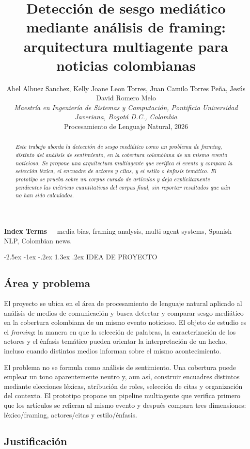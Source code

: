 \documentclass[10pt,twocolumn]{article}
\title{\textbf{Detección de sesgo mediático mediante análisis de framing:\\
arquitectura multiagente para noticias colombianas}}
\author{Abel Albuez Sanchez, Kelly Joane Leon Torres, Juan Camilo Torres Peña, Jesús David Romero Melo\\
\small\textit{Maestría en Ingeniería de Sistemas y Computación, Pontificia Universidad Javeriana, Bogotá D.C., Colombia}\\
\small Procesamiento de Lenguaje Natural, 2026}
\date{}
\makeatletter
\renewcommand{\section}{\@startsection{section}{1}{\z@}%
  {-2.5ex \@plus -1ex \@minus -.2ex}%
  {1.3ex \@plus .2ex}%
  {\normalfont\large\bfseries\centering}}
\makeatother
\begin{document}
\maketitle
\begin{abstract}
\textit{Este trabajo aborda la detección de sesgo mediático como un problema
de framing, distinto del análisis de sentimiento, en la cobertura colombiana
de un mismo evento noticioso. Se propone una arquitectura multiagente que
verifica el evento y compara la selección léxica, el encuadre de actores y
citas, y el estilo o énfasis temático. El prototipo se prueba sobre un corpus
curado de artículos y deja explícitamente pendientes las métricas cuantitativas
del corpus final, sin reportar resultados que aún no han sido calculados.}
\end{abstract}

\noindent\textbf{Index Terms---} media bias, framing analysis, multi-agent systems,
Spanish NLP, Colombian news.

\section{IDEA DE PROYECTO}

\subsection{Área y problema}

El proyecto se ubica en el área de procesamiento de lenguaje natural aplicado
al análisis de medios de comunicación y busca detectar y comparar sesgo
mediático en la cobertura colombiana de un mismo evento noticioso. El objeto
de estudio es el \emph{framing}: la manera en que la selección de palabras,
la caracterización de los actores y el énfasis temático pueden orientar la
interpretación de un hecho, incluso cuando distintos medios informan sobre el
mismo acontecimiento.

El problema no se formula como análisis de sentimiento. Una cobertura puede
emplear un tono aparentemente neutro y, aun así, construir encuadres distintos
mediante elecciones léxicas, atribución de roles, selección de citas y
organización del contexto. El prototipo propone un pipeline multiagente que
verifica primero que los artículos se refieran al mismo evento y después
compara tres dimensiones: léxico/framing, actores/citas y estilo/énfasis.

\subsection{Justificación}
\end{document}
